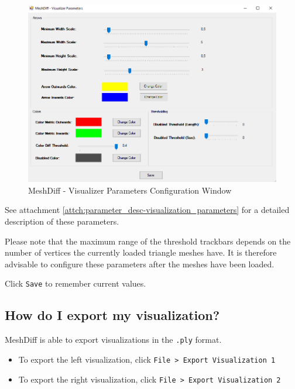 \begin{figure}[h]
\centering
\includegraphics[width=1\textwidth]{./img/meshdiff-visualizer_parameters.PNG}
\caption[MeshDiff - Visualizer Parameters]{MeshDiff - Visualizer Parameters Configuration Window}
\label{fig:meshdiff-visualizer_parameters_window}
\end{figure}

See attachment \ref{attch:parameter_desc-visualization_parameters} for a detailed description of these parameters.

Please note that the maximum range of the threshold trackbars depends on the number of vertices the currently loaded triangle meshes have. It is therefore advisable to configure these parameters after the meshes have been loaded.

Click \verb+Save+ to remember current values.

\subsection{How do I export my visualization?}
\label{attch:user_doc-export_vis}

MeshDiff is able to export visualizations in the \verb+.ply+ format.

\begin{itemize}
\item To export the left visualization, click \verb+File > Export Visualization 1+
\item To export the right visualization, click \verb+File > Export Visualization 2+
\end{itemize}

